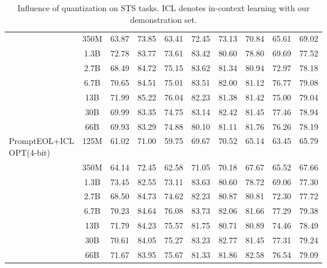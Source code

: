 \documentclass{article}
\begin{document}
\begin{table}[h]
{\begin{tabular}{lccccccccc}
 &  350M& 63.87 & 73.85 & 63.41 & 72.45 & 73.13 & 70.84 & 65.61 & 69.02 \\
 &  1.3B& 72.78 & 83.77 & 73.61 & 83.42 & 80.60 & 78.80 & 69.69 & 77.52 \\
 &  2.7B& 68.49 & 84.72 & 75.15 & 83.62 & 81.34 & 80.94 & 72.97 & 78.18 \\
 &  6.7B& 70.65 & 84.51 & 75.01 & 83.51 & 82.00 & 81.12 & 76.77 & 79.08 \\
 &  13B & 71.99 & 85.22 & 76.04 & 82.23 & 81.38 & 81.42 & 75.00 & 79.04 \\
 &  30B & 69.99 & 83.35 & 74.75 & 83.14 & 82.42 & 81.45 & 77.46 & 78.94 \\
 &  66B & 69.93 & 83.29 & 74.88 & 80.10 & 81.11 & 81.76 & 76.26 & 78.19 \\
\midrule
\multirowcell{8}[0pt][l]{PromptEOL+ICL\\OPT(4-bit)}
&  125M& 61.02 & 71.00 & 59.75 & 69.67 & 70.52 & 65.14 & 63.45 & 65.79 \\
&  350M& 64.14 & 72.45 & 62.58 & 71.05 & 70.18 & 67.67 & 65.52 & 67.66 \\
&  1.3B& 73.45 & 82.55 & 73.11 & 83.63 & 80.60 & 78.72 & 69.06 & 77.30 \\
&  2.7B& 68.50 & 84.73 & 74.62 & 82.23 & 80.87 & 80.81 & 72.30 & 77.72 \\
&  6.7B& 70.23 & 84.64 & 76.08 & 83.73 & 82.06 & 81.66 & 77.29 & 79.38 \\
&  13B & 71.79 & 84.23 & 75.57 & 81.75 & 80.71 & 80.89 & 74.46 & 78.49 \\
&  30B & 70.61 & 84.05 & 75.27 & 83.23 & 82.77 & 81.45 & 77.31 & 79.24 \\
&  66B & 71.67 & 83.95 & 75.67 & 81.33 & 81.86 & 82.58 & 76.54 & 79.09 \\
\bottomrule
\end{tabular}
}
\caption{ Influence of quantization on STS tasks. ICL denotes in-context learning with our demonstration set.
} \label{tab:quantization}
\vspace{40pt}
\end{table}

\newpage
\end{document}
